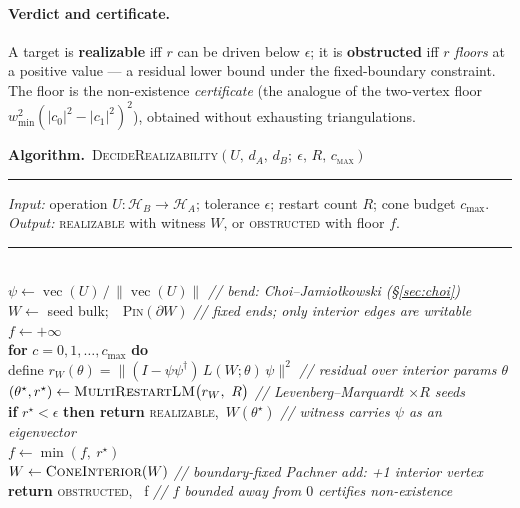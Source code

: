 \documentclass[11pt]{article}
\theoremstyle{plain}
\theoremstyle{definition}
\theoremstyle{remark}
\newcommand{\HH}{\mathcal{H}}
\newcommand{\vecop}{\operatorname{vec}}
\newcommand{\adj}{^{\dagger}}
\newenvironment{algobox}[1]
  {\par\medskip\setlength{\fboxsep}{9pt}\noindent
   \begin{lrbox}{\algoboxsave}\begin{minipage}{0.93\textwidth}
   \textbf{Algorithm.}~\textsc{#1}\par\vspace{2pt}\hrule\vspace{4pt}\footnotesize}
  {\end{minipage}\end{lrbox}\fbox{\usebox{\algoboxsave}}\par\medskip}
\begin{document}
\paragraph{Verdict and certificate.} A target is \textbf{realizable} iff $r$ can
be driven below $\epsilon$; it is \textbf{obstructed} iff $r$ \emph{floors} at a
positive value --- a residual lower bound under the fixed-boundary constraint.
The floor is the non-existence \emph{certificate} (the analogue of the
two-vertex floor $w_{\min}^2(\lvert c_0\rvert^2-\lvert c_1\rvert^2)^2$), obtained
without exhausting triangulations.

\begin{algobox}{DecideRealizability$(U,\,d_A,\,d_B;\ \epsilon,\,R,\,c_{\max})$}
\textit{Input:} operation $U:\HH_B\!\to\!\HH_A$; tolerance $\epsilon$; restart
count $R$; cone budget $c_{\max}$.\\
\textit{Output:} \textsc{realizable} with witness $W$, or \textsc{obstructed}
with floor $f$.\\[3pt]
\rule{\linewidth}{0.4pt}\\[4pt]
$\psi \leftarrow \vecop(U)\,/\,\lVert\vecop(U)\rVert$
   \hfill\textit{// bend: Choi--Jamio\l kowski (\S\ref{sec:choi})}\\[1pt]
$W \leftarrow$ seed bulk;\ \ \textsc{Pin}$(\partial W)$
   \hfill\textit{// fixed ends; only interior edges are writable}\\[1pt]
$f \leftarrow +\infty$\\[1pt]
\textbf{for } $c = 0,1,\dots,c_{\max}$ \textbf{ do}\\[1pt]
\hspace*{1.6em} define $r_W(\theta) = \lVert (I-\psi\psi\adj)\,L(W;\theta)\,\psi\rVert^2$
   \hfill\textit{// residual over interior params $\theta$}\\[1pt]
\hspace*{1.6em} $(\theta^\star, r^\star) \leftarrow
   \textsc{MultiRestartLM}\big(r_W,\ R\big)$
   \hfill\textit{// Levenberg--Marquardt $\times R$ seeds}\\[1pt]
\hspace*{1.6em} \textbf{if } $r^\star < \epsilon$ \textbf{ then return }
   \textsc{realizable},\ $W(\theta^\star)$
   \hfill\textit{// witness carries $\psi$ as an eigenvector}\\[1pt]
\hspace*{1.6em} $f \leftarrow \min(f,\ r^\star)$\\[1pt]
\hspace*{1.6em} $W \leftarrow \textsc{ConeInterior}(W)$
   \hfill\textit{// boundary-fixed Pachner add: +1 interior vertex}\\[1pt]
\textbf{return } \textsc{obstructed},\  f
   \hfill\textit{// $f$ bounded away from $0$ certifies non-existence}
\end{algobox}
\end{document}
